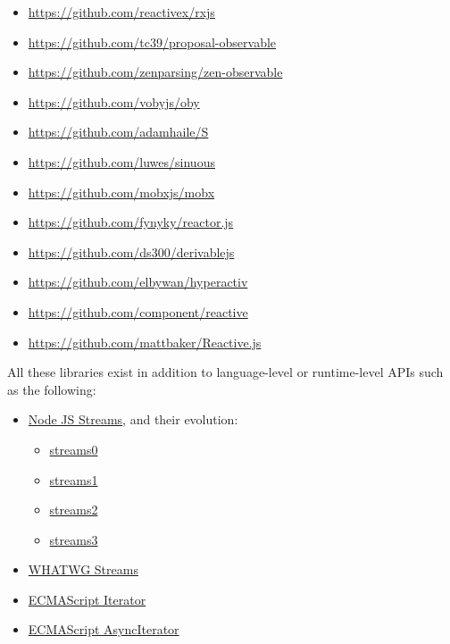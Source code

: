 \documentclass[sigplan,screen,10pt,review]{acmart}
\begin{document}
\begin{itemize}
    \item \url{https://github.com/reactivex/rxjs}
    \item \url{https://github.com/tc39/proposal-observable}
    \item \url{https://github.com/zenparsing/zen-observable}
    \item \url{https://github.com/vobyjs/oby}
    \item \url{https://github.com/adamhaile/S}
    \item \url{https://github.com/luwes/sinuous}
    \item \url{https://github.com/mobxjs/mobx}
    \item \url{https://github.com/fynyky/reactor.js}
    \item \url{https://github.com/ds300/derivablejs}
    \item \url{https://github.com/elbywan/hyperactiv}
    \item \url{https://github.com/component/reactive}
    \item \url{https://github.com/mattbaker/Reactive.js}
\end{itemize}

All these libraries exist in addition to language-level or runtime-level APIs such as the following:

\begin{itemize}
    \item \href{https://nodejs.org/api/stream.html}{Node JS Streams}, and their evolution: \begin{itemize}
        \item \href{https://nodejs.org/docs/v0.1.100/api.html}{streams0}
        \item \href{https://nodejs.org/docs/v0.4.0/api/streams.html}{streams1}
        \item \href{https://nodejs.org/docs/v0.10.0/api/stream.html}{streams2}
        \item \href{https://nodejs.org/docs/v0.11.5/api/stream.html}{streams3}
    \end{itemize}
    \item \href{https://streams.spec.whatwg.org/}{WHATWG Streams}
    \item \href{https://tc39.es/ecma262/multipage/control-abstraction-objects.html#sec-%iteratorprototype%-object}{ECMAScript Iterator}
    \item \href{https://tc39.es/ecma262/multipage/control-abstraction-objects.html#sec-asynciteratorprototype}{ECMAScript AsyncIterator}
\end{itemize}



\end{document}
